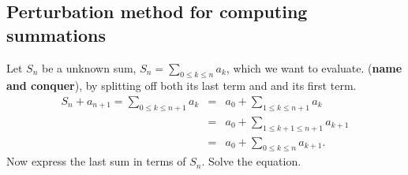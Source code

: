 \subsection{Perturbation method for computing summations}
\bit
\w 
Let $S_n$ be a unknown sum, $S_n = \sum_{0\le{k}\le n} a_k$,
which we want to evaluate.
\ben
{} ({\bf{}name and conquer}),
by splitting off both its last term and and its first term.
\begin{eqnarray*}
S_n + a_{n+1} = \sum_{0\le{k}\le n+1}a_k & = &
	a_0 + \sum_{1\le{k}\le{n+1}}a_k \\
	& = & a_0 + \sum_{1\le{k+1}\le n+1} a_{k+1} \\
	& = & a_0 + \sum_{0\le k\le n} a_{k+1}.
\end{eqnarray*}
\w Now express the last sum in terms of $S_n$.
\w Solve the equation.
\een
\eit

